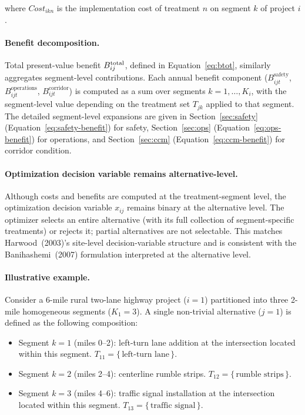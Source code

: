 \noindent where $\mathit{Cost}_{ikn}$ is the implementation cost of
treatment $n$ on segment $k$ of project $i$.

\paragraph{Benefit decomposition.} Total present-value benefit
$B^{\mathrm{total}}_{ij}$, defined in Equation~\ref{eq:btot}, similarly aggregates
segment-level contributions. Each annual benefit component
($B_{ijt}^{\mathrm{safety}}$, $B_{ijt}^{\mathrm{operations}}$,
$B_{ijt}^{\mathrm{corridor}}$) is computed as a sum over segments
$k = 1, \ldots, K_i$, with the segment-level value depending on the
treatment set $T_{jk}$ applied to that segment. The detailed
segment-level expansions are given in Section~\ref{sec:safety}
(Equation~\ref{eq:safety-benefit}) for safety, Section~\ref{sec:ops}
(Equation~\ref{eq:ops-benefit}) for operations, and Section~\ref{sec:ccm}
(Equation~\ref{eq:ccm-benefit}) for corridor condition.

\paragraph{Optimization decision variable remains alternative-level.}
Although costs and benefits are computed at the treatment-segment level,
the optimization decision variable $x_{ij}$ remains binary at the
alternative level. The optimizer selects an entire alternative (with its
full collection of segment-specific treatments) or rejects it; partial
alternatives are not selectable. This matches Harwood~(2003)'s site-level
decision-variable structure and is consistent with the Banihashemi~(2007)
formulation interpreted at the alternative level.

\paragraph{Illustrative example.} Consider a 6-mile rural two-lane highway
project ($i = 1$) partitioned into three 2-mile homogeneous segments
($K_1 = 3$). A single non-trivial alternative ($j = 1$) is defined as the
following composition:
\begin{itemize}[leftmargin=2em, itemsep=2pt]
  \item Segment $k = 1$ (miles 0--2): left-turn lane addition at the
    intersection located within this segment. $T_{11} = \{\,\text{left-turn lane}\,\}$.
  \item Segment $k = 2$ (miles 2--4): centerline rumble strips.
    $T_{12} = \{\,\text{rumble strips}\,\}$.
  \item Segment $k = 3$ (miles 4--6): traffic signal installation at the
    intersection located within this segment.
    $T_{13} = \{\,\text{traffic signal}\,\}$.
\end{itemize}

